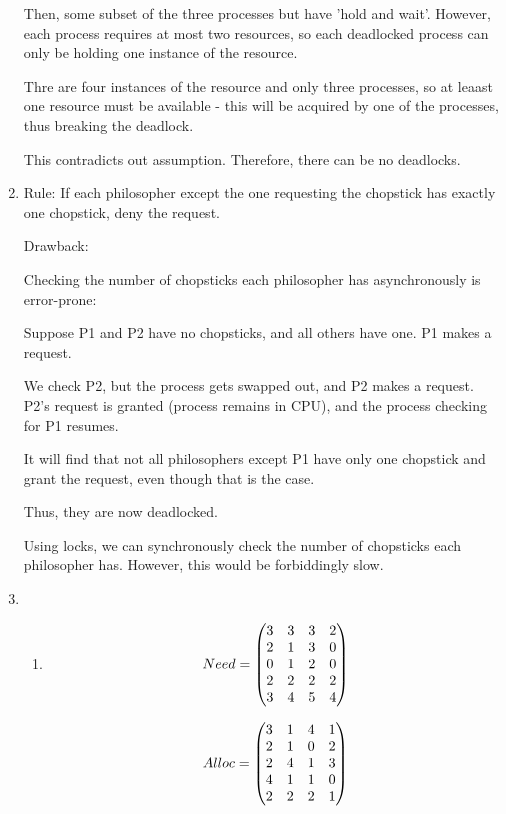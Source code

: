 \documentclass{amsart}
\begin{document}
\begin{enumerate}
    Then, some subset of the three processes but have 'hold and wait'. However, each process requires at most two resources, so each deadlocked process can only be holding one instance of the resource.

    Thre are four instances of the resource and only three processes, so at leaast one resource must be available - this will be acquired by one of the processes, thus breaking the deadlock.

    This contradicts out assumption. Therefore, there can be no deadlocks.
    \item 
    Rule: If each philosopher except the one requesting the chopstick has exactly one chopstick, deny the request.
    
    Drawback: 
    
    Checking the number of chopsticks each philosopher has asynchronously is error-prone: 
    
    Suppose P1 and P2 have no chopsticks, and all others have one. P1 makes a request. 
    
    We check P2, but the process gets swapped out, and P2 makes a request. P2's request is granted (process remains in CPU), and the process checking for P1 resumes. 
    
    It will find that not all philosophers except P1 have only one chopstick and grant the request, even though that is the case. 
    
    Thus, they are now deadlocked.
    
    Using locks, we can synchronously check the number of chopsticks each philosopher has. However, this would be forbiddingly slow.
    \item \begin{enumerate}
        \item 
    
    \[Need = \begin{pmatrix}
        3 & 3 & 3 & 2 \\
        2 & 1 & 3 & 0 \\
        0 & 1 & 2 & 0 \\
        2 & 2 & 2 & 2 \\
        3 & 4 & 5 & 4
    \end{pmatrix}\]

    
    \[Alloc = \begin{pmatrix}
        3 & 1 & 4 & 1 \\
        2 & 1 & 0 & 2 \\
        2 & 4 & 1 & 3 \\
        4 & 1 & 1 & 0 \\
        2 & 2 & 2 & 1
    \end{pmatrix}\]


\end{enumerate}
\end{enumerate}
\end{document}
